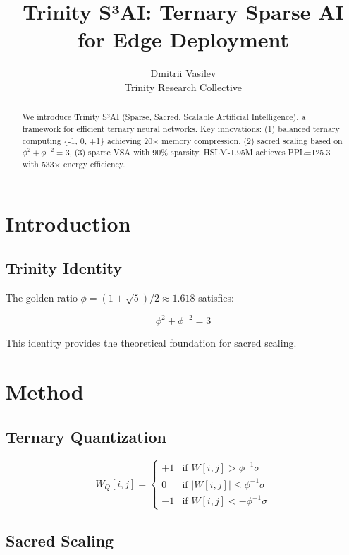 \documentclass{article}
\title{Trinity S³AI: Ternary Sparse AI for Edge Deployment}
\author{
  Dmitrii Vasilev \\
  Trinity Research Collective
}
\begin{document}
\maketitle

\begin{abstract}
We introduce Trinity S³AI (Sparse, Sacred, Scalable Artificial Intelligence), a framework for efficient ternary neural networks. Key innovations: (1) balanced ternary computing \{-1, 0, +1\} achieving 20× memory compression, (2) sacred scaling based on $\phi^2 + \phi^{-2} = 3$, (3) sparse VSA with 90\% sparsity. HSLM-1.95M achieves PPL=125.3 with 533× energy efficiency.
\end{abstract}

\section{Introduction}

\subsection{Trinity Identity}

The golden ratio $\phi = (1+\sqrt{5})/2 \approx 1.618$ satisfies:

\begin{equation}
\phi^2 + \phi^{-2} = 3
\end{equation}

This identity provides the theoretical foundation for sacred scaling.

\section{Method}

\subsection{Ternary Quantization}

\begin{equation}
W_Q[i,j] = \begin{cases}
+1 & \text{if } W[i,j] > \phi^{-1} \sigma \\
0 & \text{if } |W[i,j]| \leq \phi^{-1} \sigma \\
-1 & \text{if } W[i,j] < -\phi^{-1} \sigma
\end{cases}
\end{equation}

\subsection{Sacred Scaling}
\end{document}

